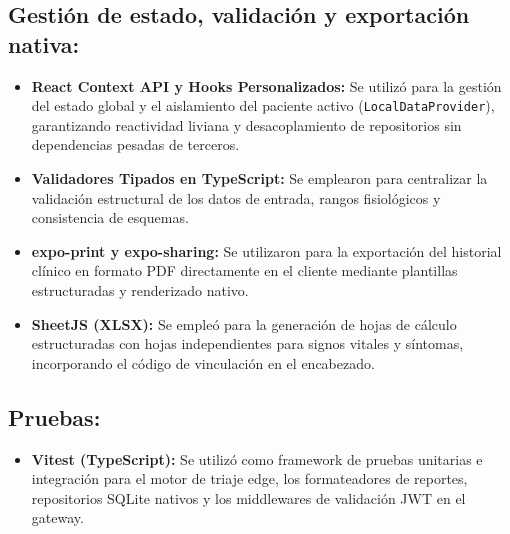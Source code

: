 \subsection*{Gestión de estado, validación y exportación nativa:}
\begin{itemize}
    \item \textbf{React Context API y Hooks Personalizados:} Se utilizó para la gestión del estado global y el aislamiento del paciente activo (\texttt{LocalDataProvider}), garantizando reactividad liviana y desacoplamiento de repositorios sin dependencias pesadas de terceros.
    \item \textbf{Validadores Tipados en TypeScript:} Se emplearon para centralizar la validación estructural de los datos de entrada, rangos fisiológicos y consistencia de esquemas.
    \item \textbf{expo-print y expo-sharing:} Se utilizaron para la exportación del historial clínico en formato PDF directamente en el cliente mediante plantillas estructuradas y renderizado nativo.
    \item \textbf{SheetJS (XLSX):} Se empleó para la generación de hojas de cálculo estructuradas con hojas independientes para signos vitales y síntomas, incorporando el código de vinculación en el encabezado.
\end{itemize}

\subsection*{Pruebas:}
\begin{itemize}
    \item \textbf{Vitest (TypeScript):} Se utilizó como framework de pruebas unitarias e integración para el motor de triaje edge, los formateadores de reportes, repositorios SQLite nativos y los middlewares de validación JWT en el gateway.
\end{itemize}

